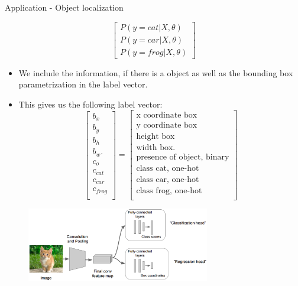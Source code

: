 \begin{vbframe}{Application - Object localization}
\begin{itemize}
$$            \begin{bmatrix}
            P(y = cat| X, \theta)\\
            P(y = car| X, \theta)\\
            P(y = frog| X, \theta)
            \end{bmatrix}
            $$
                \end{itemize}
            \framebreak
            \begin{itemize}
            \item We include the information, if there is a object as well as the bounding box parametrization in the label vector.
            \item This gives us the following label vector:
                $$
                \begin{bmatrix}
            b_x\\
            b_y \\
            b_h \\
            b_w.\\
            c_o \\
            c_{cat} \\
            c_{car} \\
            c_{frog} \\
            \end{bmatrix} =             
                \begin{bmatrix}
            \text{x coordinate box}\\
            \text{y coordinate box} \\
            \text{height box} \\
            \text{width box}.\\
            \text{presence of object, binary} \\
            \text{class cat, one-hot} \\
            \text{class car, one-hot}\\
            \text{class frog, one-hot} \\
            \end{bmatrix}
            $$
                \end{itemize}
            \framebreak
            \begin{figure}
            \centering
            \includegraphics[width=8cm]{figure/naive_localization.png}

\end{figure}
\end{vbframe}
